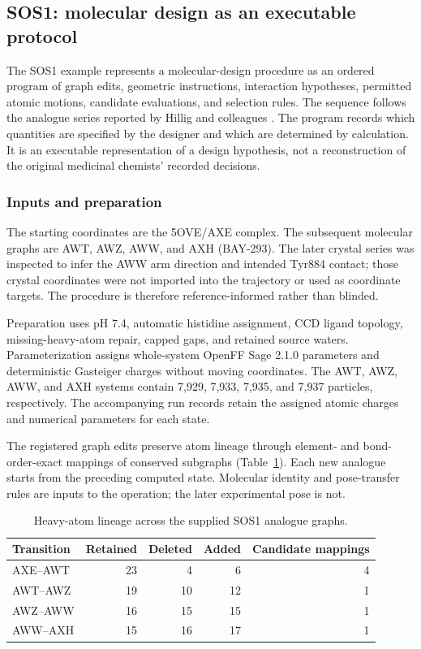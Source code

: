 \subsection{SOS1: molecular design as an executable protocol}

The SOS1 example represents a molecular-design procedure as an ordered program of graph edits, geometric instructions, interaction hypotheses, permitted atomic motions, candidate evaluations, and selection rules. The sequence follows the analogue series reported by Hillig and colleagues \citep{hillig2019sos1}. The program records which quantities are specified by the designer and which are determined by calculation. It is an executable representation of a design hypothesis, not a reconstruction of the original medicinal chemists' recorded decisions.

\subsubsection{Inputs and preparation}

The starting coordinates are the 5OVE/AXE complex. The subsequent molecular graphs are AWT, AWZ, AWW, and AXH (BAY-293). The later crystal series was inspected to infer the AWW arm direction and intended Tyr884 contact; those crystal coordinates were not imported into the trajectory or used as coordinate targets. The procedure is therefore reference-informed rather than blinded.

Preparation uses pH 7.4, automatic histidine assignment, CCD ligand topology, missing-heavy-atom repair, capped gaps, and retained source waters. Parameterization assigns whole-system OpenFF Sage 2.1.0 parameters and deterministic Gasteiger charges without moving coordinates. The AWT, AWZ, AWW, and AXH systems contain 7,929, 7,933, 7,935, and 7,937 particles, respectively. The accompanying run records retain the assigned atomic charges and numerical parameters for each state.

The registered graph edits preserve atom lineage through element- and bond-order-exact mappings of conserved subgraphs (Table~\ref{tab:appA_lineage}). Each new analogue starts from the preceding computed state. Molecular identity and pose-transfer rules are inputs to the operation; the later experimental pose is not.

\begin{table}[htbp]
\centering\small
\caption{Heavy-atom lineage across the supplied SOS1 analogue graphs.}
\label{tab:appA_lineage}
\begin{tabular}{@{}lrrrr@{}}
\toprule
\textbf{Transition} & \textbf{Retained} & \textbf{Deleted} & \textbf{Added} & \textbf{Candidate mappings}\\
\midrule
AXE--AWT & 23 & 4 & 6 & 4\\
AWT--AWZ & 19 & 10 & 12 & 1\\
AWZ--AWW & 16 & 15 & 15 & 1\\
AWW--AXH & 15 & 16 & 17 & 1\\
\bottomrule
\end{tabular}
\end{table}

